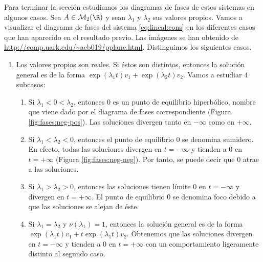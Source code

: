 Para terminar la sección estudiamos los diagramas de fases de estos sistemas en algunos casos. Sea
$A \in \mathcal{M}_2(\R)$ y sean $\lambda_1$ y $\lambda_2$ sus valores propios. Vamos a visualizar
el diagrama de fases del sistema \eqref{eq:lineal:cons} en los diferentes casos que han aparecido en
el resultado previo. Las imágenes se han obtenido de
\url{http://comp.uark.edu/~aeb019/pplane.html}. Distinguimos los siguientes casos.

\begin{enumerate}
\item Los valores propios son reales. Si éstos son distintos, entonces la solución general es de la
  forma $\exp(\lambda_1 t) v_1 + \exp(\lambda_2 t) v_2$.  Vamos a estudiar $4$ subcasos:
  \begin{enumerate}[label=\arabic*.]
  \item Si $\lambda_1 < 0 < \lambda_2$, entonces $0$ es un punto de equilibrio hiperbólico, nombre
    que viene dado por el diagrama de fases correspondiente (Figura \ref{fig:fases:neg-pos}). Las
    soluciones divergen tanto en $-\infty$ como en $+\infty$.
  \item Si $\lambda_1 < \lambda_2 < 0$, entonces el punto de equilibrio $0$ se denomina sumidero. En
    efecto, todas las soluciones divergen en $t=-\infty$ y tienden a $0$ en $t=+\infty$ (Figura
    \ref{fig:fases:neg-neg}). Por tanto, se puede decir que $0$ atrae a las soluciones.
  \item Si $\lambda_1 > \lambda_2 > 0$, entonces las soluciones tienen límite $0$ en $t = -\infty$ y
    divergen en $t=+\infty$. El punto de equilibrio $0$ se denomina foco debido a que las soluciones
    se alejan de éste.
  \item Si $\lambda_1 = \lambda_2$ y $\nu(\lambda_1) = 1$, entonces la solución general es de la
    forma $\exp(\lambda_1 t) v_1 + t\exp(\lambda_1 t) v_2$. Obtenemos que las soluciones divergen en
    $t=-\infty$ y tienden a $0$ en $t=+\infty$ con un comportamiento ligeramente distinto al segundo
    caso.
  \end{enumerate}
  \begin{figure}[H]
    \centering
    \begin{subfigure}{.45\textwidth}
      \centering

\end{subfigure}
\end{figure}
\end{enumerate}
